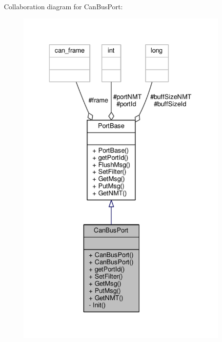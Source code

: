 Collaboration diagram for Can\+Bus\+Port\+:\nopagebreak
\begin{figure}[H]
\begin{center}
\leavevmode
\includegraphics[width=299pt]{classCanBusPort__coll__graph}
\end{center}
\end{figure}
